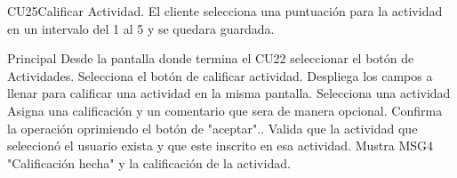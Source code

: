 
\begin{UseCase}{CU25}{Calificar Actividad.}{
		El cliente selecciona una puntuación para la actividad en un intervalo del 1 al 5 y se quedara guardada.
	}
\end{UseCase}

\begin{UCtrayectoria}{Principal}
	\UCpaso[\UCactor] Desde la pantalla donde termina el CU22 seleccionar el botón de Actividades.
	\UCpaso[\UCactor] Selecciona el botón de calificar actividad.
	\UCpaso Despliega los campos a llenar para calificar una actividad en la misma pantalla.
	\UCpaso[\UCactor] Selecciona una actividad
	\UCpaso[\UCactor] Asigna una calificación y un comentario que sera de manera opcional.
	\UCpaso[\UCactor] Confirma la operación oprimiendo el botón de "aceptar"..
	\UCpaso Valida que la actividad que seleccionó el usuario exista y que este inscrito en esa actividad.
	\UCpaso Mustra MSG4 "Calificación hecha" y la calificación de la actividad.
	
\end{UCtrayectoria}





